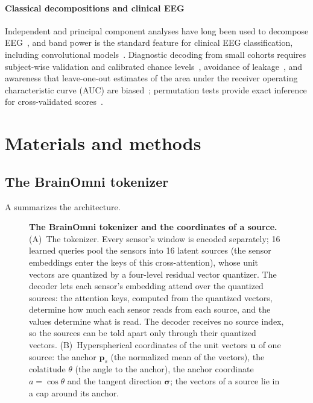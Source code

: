 \documentclass[10pt,letterpaper]{article}
\newcommand{\anchor}{\bm{p}}
\newcommand{\uvec}{\bm{u}}
\begin{document}
\paragraph*{Classical decompositions and clinical EEG}
Independent and principal component analyses have long been used to decompose EEG~\cite{makeig1996,bell1995infomax,hyvarinen2000}, and band power is the standard feature
for clinical EEG classification, including convolutional models~\cite{schirrmeister2017,eegnet2018}. Diagnostic decoding from small cohorts requires
subject-wise validation and calibrated chance levels~\cite{saeb2017usecase,varoquaux2017assessing,varoquaux2018cvfailure,
combrisson2015chance,poldrack2020bestpractices}, avoidance of leakage~\cite{kapoor2023leakage,brookshire2024leakage}, and awareness that leave-one-out
estimates of the area under the receiver operating characteristic curve (AUC) are biased~\cite{parker2007stratification,airola2011auc}; permutation tests provide exact inference for cross-validated scores~\cite{ojala2010permutation}.

\section*{Materials and methods}\label{sec:methods}

\subsection*{The BrainOmni tokenizer}\label{sec:background}

A summarizes the architecture.

\begin{figure}[!h]
\caption{{\bf The BrainOmni tokenizer and the coordinates of a source.}
(A)~The tokenizer. Every sensor's window is encoded separately; 16 learned queries
  pool the sensors into 16 latent sources (the sensor embeddings enter the keys of this
  cross-attention), whose unit vectors are quantized by a four-level residual
  vector quantizer. The decoder lets each sensor's embedding attend over the quantized sources: the
  attention keys, computed from the quantized vectors, determine how much each sensor reads from each
  source, and the values determine what is read. The decoder receives no source index, so the
  sources can be told apart only through their quantized vectors. (B)~Hyperspherical coordinates of
  the unit vectors $\uvec$ of one source: the anchor $\anchor_s$ (the normalized mean of the vectors),
  the colatitude $\theta$ (the angle to the anchor), the anchor coordinate $a=\cos\theta$ and the
  tangent direction $\bm{\sigma}$; the vectors of a source lie in a cap around its anchor.}
\label{fig:overview}
\end{figure}
\end{document}
